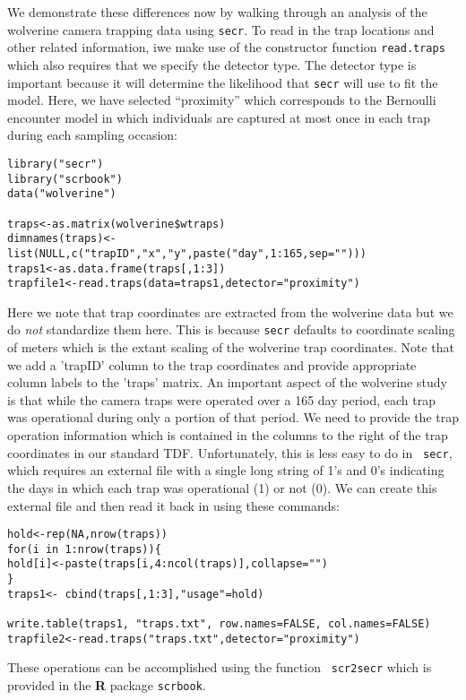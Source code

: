 We demonstrate these differences now by
walking through an analysis of the wolverine camera trapping data
using  \mbox{\tt secr}.
To read in
the trap locations and other related information, iwe make use of the
constructor function \mbox{\tt read.traps} which also requires that we
specify the detector type.
The
detector type is important because it will determine the likelihood
that \mbox{\tt secr} will use to fit the model.  Here, we have
selected ``proximity'' which corresponds to the Bernoulli encounter
model in which individuals are captured at most once in each trap
during each sampling occasion: 
{\small
\begin{verbatim}
library("secr")
library("scrbook")
data("wolverine")

traps<-as.matrix(wolverine$wtraps)
dimnames(traps)<-list(NULL,c("trapID","x","y",paste("day",1:165,sep="")))
traps1<-as.data.frame(traps[,1:3])
trapfile1<-read.traps(data=traps1,detector="proximity")
\end{verbatim}
}
Here we note that trap coordinates are extracted from the wolverine
data but we do {\it not} standardize them here. This is because
\mbox{\tt secr} defaults to coordinate scaling of meters which is the
extant scaling of the wolverine trap coordinates. Note that we add a 'trapID' column to
the trap coordinates and provide appropriate column labels to the
'traps' matrix. 
An important aspect of the
wolverine study is that while the camera traps were operated over a
165 day period, each trap was operational during only a portion of
that period. We need to provide the trap operation information which
is contained in the columns to the right of the trap coordinates in
our standard TDF. Unfortunately, this is less easy to do in \mbox{\tt
  secr}, which requires an external file with a single long string of
1's and 0's indicating the days in which each trap was operational (1)
or not (0). We can create this external file and then read it back in
using these commands:
\begin{verbatim}
hold<-rep(NA,nrow(traps))
for(i in 1:nrow(traps)){
hold[i]<-paste(traps[i,4:ncol(traps)],collapse="")
}
traps1<- cbind(traps[,1:3],"usage"=hold)

write.table(traps1, "traps.txt", row.names=FALSE, col.names=FALSE)
trapfile2<-read.traps("traps.txt",detector="proximity") 
\end{verbatim}
These operations can be accomplished using the function \mbox{\tt
  scr2secr} which is provided in the {\bf R} package \mbox{\tt scrbook}.

